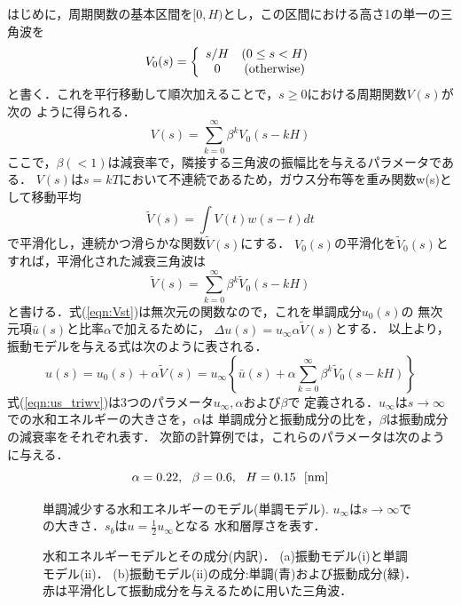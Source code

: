 はじめに，周期関数の基本区間を$[0,H)$とし，この区間における高さ1の単一の三角波を
\begin{equation}
	V_0(s)=\left\{
		\begin{array}{cc}
			s/H & (0\leq s < H) \\
			0 & ({\rm otherwise})
		\end{array}
	\right.
	\label{eqn:V0}
\end{equation}
と書く．これを平行移動して順次加えることで，$s\geq 0$における周期関数$V(s)$が次の
ように得られる．
\begin{equation}
	V(s)=\sum_{k=0}^{\infty} \beta ^{k} V_0(s-kH)
	\label{eqn:Vs}
\end{equation}
ここで，$\beta(<1)$は減衰率で，隣接する三角波の振幅比を与えるパラメータである．
$V(s)$は$s=kT$において不連続であるため，ガウス分布等を重み関数w(s)として移動平均
\begin{equation}
	\tilde V(s)=\int V(t)w(s-t)dt
	\label{eqn:mv_ave}
\end{equation}
で平滑化し，連続かつ滑らかな関数$\tilde V(s)$にする．
$V_0(s)$の平滑化を$\tilde V_0(s)$とすれば，平滑化された減衰三角波は
\begin{equation}
	\tilde V(s)=\sum_{k=0}^{\infty} \beta ^{k} \tilde V_0(s-kH)
	\label{eqn:Vst}
\end{equation}
と書ける．式(\ref{eqn:Vst})は無次元の関数なので，これを単調成分$u_0(s)$の
無次元項$\bar{u}(s)$と比率$\alpha$で加えるために，
$\Delta u(s)=u_\infty\alpha \tilde V(s)$とする．
以上より，振動モデルを与える式は次のように表される．
\begin{equation}
	u(s)=u_0(s)+ \alpha \tilde V(s)= u_{\infty}\left\{ 
	\bar{u}(s)+ \alpha \sum_{k=0}^{\infty} \beta ^{k} \tilde V_0(s-kH)
	\right\}
	\label{eqn:us_triwv}
\end{equation}
式(\ref{eqn:us_triwv})は3つのパラメータ$u_{\infty},\alpha$および$\beta$で
定義される．$u_{\infty}$は$s\rightarrow \infty$での水和エネルギーの大きさを，$\alpha$は
単調成分と振動成分の比を，$\beta$は振動成分の減衰率をそれぞれ表す．
次節の計算例では，これらのパラメータは次のように与える．
\begin{equation}
	\alpha=0.22, \ \ \beta=0.6, \ \ H=0.15 \ \ [{\rm nm}]
	\label{eqn:}
\end{equation}
\begin{figure}[h]
	\begin{center}
	\end{center}
	\caption{
		単調減少する水和エネルギーのモデル(単調モデル).
		$u_{\infty}$は$s\rightarrow \infty$での大きさ．$s_b$は$u=\frac{1}{2}u_{\infty}$となる
		水和層厚さを表す．
	} 
	\label{fig:fig1}
\end{figure}
\begin{figure}[h]
	\begin{center}
	\end{center}
	\caption{
		水和エネルギーモデルとその成分(内訳)．
		(a)振動モデル(i)と単調モデル(ii)．
		(b)振動モデル(ii)の成分:単調(青)および振動成分(緑)．
		赤は平滑化して振動成分を与えるために用いた三角波．
	} 
	\label{fig:fig2}
\end{figure}
